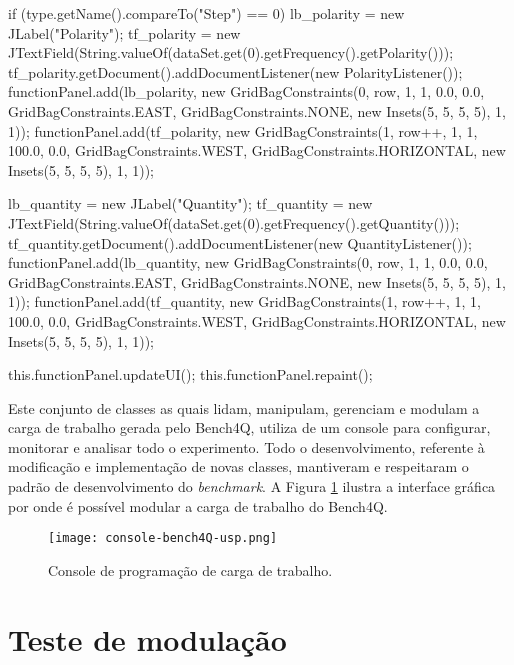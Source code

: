 \begin{codigo}[caption={Código para gerar a os parâmetros para a modulação}, label={code:panel}, breaklines=true]
{		if (type.getName().compareTo("Step") == 0) {
			lb_polarity = new JLabel("Polarity");
			tf_polarity = new JTextField(String.valueOf(dataSet.get(0).getFrequency().getPolarity()));
			tf_polarity.getDocument().addDocumentListener(new PolarityListener());
			functionPanel.add(lb_polarity, new GridBagConstraints(0, row, 1, 1, 0.0, 0.0, GridBagConstraints.EAST,
			GridBagConstraints.NONE, new Insets(5, 5, 5, 5), 1, 1));
			functionPanel.add(tf_polarity, new GridBagConstraints(1, row++, 1, 1, 100.0, 0.0, GridBagConstraints.WEST,
			GridBagConstraints.HORIZONTAL, new Insets(5, 5, 5, 5), 1, 1));
		}
		
		lb_quantity = new JLabel("Quantity");
		tf_quantity = new JTextField(String.valueOf(dataSet.get(0).getFrequency().getQuantity()));
		tf_quantity.getDocument().addDocumentListener(new QuantityListener());
		functionPanel.add(lb_quantity, new GridBagConstraints(0, row, 1, 1, 0.0, 0.0, GridBagConstraints.EAST,
		GridBagConstraints.NONE, new Insets(5, 5, 5, 5), 1, 1));
		functionPanel.add(tf_quantity, new GridBagConstraints(1, row++, 1, 1, 100.0, 0.0, GridBagConstraints.WEST,
		GridBagConstraints.HORIZONTAL, new Insets(5, 5, 5, 5), 1, 1));
		
		this.functionPanel.updateUI();
		this.functionPanel.repaint();
		
	}
\end{codigo}

Este conjunto de classes as quais lidam, manipulam, gerenciam e modulam a carga de trabalho gerada pelo Bench4Q, utiliza de um console para configurar, monitorar e analisar todo o experimento. Todo o desenvolvimento, referente à modificação e implementação de novas classes, mantiveram e respeitaram o padrão de desenvolvimento do \textit{benchmark}. A Figura \ref{fig:interface-criada-beanch4q} ilustra a interface gráfica por onde é possível modular a carga de trabalho do Bench4Q. 

\begin{figure}[!htb]
	\centering
	\texttt{[image: console-bench4Q-usp.png]}
	\caption{Console de programação de carga de trabalho.}
	\label{fig:interface-criada-beanch4q}
	\fautor
\end{figure}


\section{Teste de modulação}

